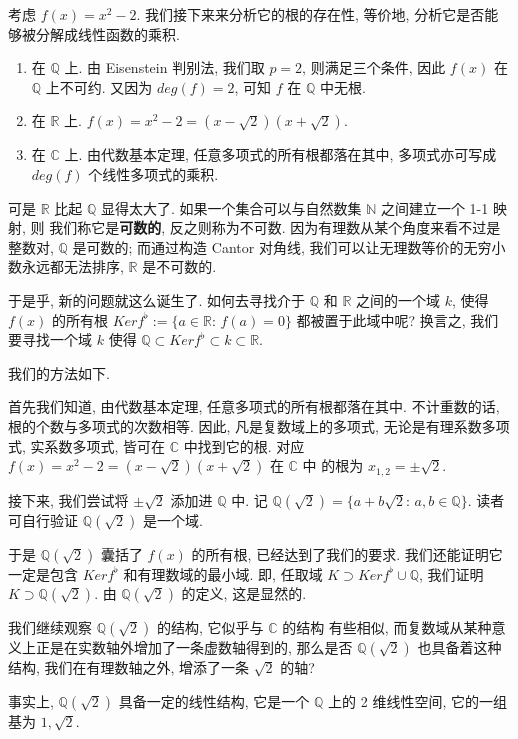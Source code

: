 \documentclass[UTF8]{book}
\begin{document}
\begin{example}
    考虑 $f(x) = x^2 -2$. 
    我们接下来来分析它的根的存在性, 等价地, 分析它是否能够被分解成线性函数的乘积. 

    \begin{enumerate}
        \item 在 $\mathbb{Q}$ 上. 由 Eisenstein 判别法, 我们取 $p=2$, 
        则满足三个条件, 因此 $f(x)$ 在  $\mathbb{Q}$ 上不可约. 
        又因为 $deg(f) = 2$, 可知 $f$ 在 $\mathbb{Q}$ 中无根. 

        \item 在 $\mathbb{R}$ 上. 
        $f(x) = x^2-2 = (x-\sqrt{2})(x+\sqrt{2})$. 

        \item 在 $\mathbb{C}$ 上. 由代数基本定理, 任意多项式的所有根都落在其中, 
        多项式亦可写成 $deg(f)$ 个线性多项式的乘积. 
    \end{enumerate}
    
    可是 $\mathbb{R}$ 比起 $\mathbb{Q}$ 显得太大了. 
    如果一个集合可以与自然数集 $\mathbb{N}$ 之间建立一个 1-1 映射, 则
    我们称它是\textbf{可数的}, 反之则称为不可数. 
    因为有理数从某个角度来看不过是整数对, $\mathbb{Q}$ 是可数的; 
    而通过构造 Cantor 对角线, 我们可以让无理数等价的无穷小数永远都无法排序, 
    $\mathbb{R}$ 是不可数的. 

    于是乎, 新的问题就这么诞生了. 如何去寻找介于 $\mathbb{Q}$ 和 $\mathbb{R}$ 
    之间的一个域 $k$, 使得 $f(x)$ 的所有根 $Ker f^{\flat} := 
    \{a\in \mathbb{R}:\,f(a) = 0\}$ 都被置于此域中呢? 
    换言之, 我们要寻找一个域 $k$ 使得 $\mathbb{Q} \subset Ker f^{\flat} 
    \subset k \subset \mathbb{R}$. 

    我们的方法如下. 
    
    首先我们知道, 由代数基本定理, 任意多项式的所有根都落在其中. 
    不计重数的话, 根的个数与多项式的次数相等. 因此, 凡是复数域上的多项式, 
    无论是有理系数多项式, 实系数多项式, 皆可在 $\mathbb{C}$ 中找到它的根. 
    对应 $f(x) = x^2 - 2 = (x-\sqrt{2})(x+\sqrt{2})$ 在 $\mathbb{C}$ 中
    的根为 $ x_{1,2} = \pm \sqrt{2} $. 

    接下来, 我们尝试将 $\pm \sqrt{2}$ 添加进 $\mathbb{Q}$ 中. 
    记 $\mathbb{Q}(\sqrt{2}) = \{a+b\sqrt{2}:\,a,b\in \mathbb{Q}\}$. 
    读者可自行验证 $\mathbb{Q}(\sqrt{2})$ 是一个域. 

    于是 $\mathbb{Q}(\sqrt{2})$ 囊括了 $f(x)$ 的所有根, 已经达到了我们的要求. 
    我们还能证明它一定是包含 $Ker f^{\flat}$ 和有理数域的最小域. 
    即, 任取域 $K \supset Ker f^{\flat} \cup \mathbb{Q}$, 我们证明 $K \supset 
    \mathbb{Q}(\sqrt{2})$. 由 $\mathbb{Q}(\sqrt{2})$ 的定义, 这是显然的. 

    我们继续观察 $\mathbb{Q}(\sqrt{2})$ 的结构, 它似乎与 $\mathbb{C}$ 的结构
    有些相似, 而复数域从某种意义上正是在实数轴外增加了一条虚数轴得到的, 
    那么是否 $\mathbb{Q}(\sqrt{2})$ 也具备着这种结构, 我们在有理数轴之外, 
    增添了一条 $\sqrt{2}$ 的轴? 

    事实上, $\mathbb{Q}(\sqrt{2})$ 具备一定的线性结构, 
    它是一个 $\mathbb{Q}$ 上的 2 维线性空间, 它的一组基为 $ 1,\sqrt{2}$. 
\end{example}
\end{document}
